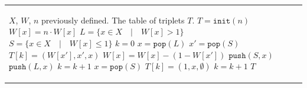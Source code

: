 \begin{algorithm}[htb]
\caption{Building of the Alias Tables by Vose (adaptation for fractions) and by Rust language} 
\label{algo:preprocessing}
    \begin{tabular}{l l}
        \begin{minipage}{0.52\textwidth}
            \begin{algorithmic}[1]
                \scriptsize
                \renewcommand{\algorithmicrequire}{\textbf{Input:}}
                \renewcommand{\algorithmicensure}{\textbf{Output:}}
                \Require $X$, $W$, $n$ previously defined.
                \Ensure  The table of triplets $T$.
                \Function{Table\_Fractions}{$X, n, W$}
                    \State $T = \texttt{init}(n)$ %
                    \For{$x \in X$}
                        \State $W[x] = n \cdot W[x]$ %
                    \EndFor
                    \State $L = \{x \in X \quad | \quad W[x] > 1\}$ %
                    \State $S = \{x \in X \quad | \quad W[x] \leq 1\}$ %
                    \State $k = 0$
                    \While{$L$ is not empty}
                        \State $x = \texttt{pop}(L)$ %
                        \State $x' = \texttt{pop}(S)$ 
                        \State $T[k] = (W[x'], x', x)$
                        \State $W[x] = W[x] - (1 - W[x'])$
                        \If{$W[x] \leq 1$}
                            \State $\texttt{push}(S, x)$ %
                        \Else
                            \State $\texttt{push}(L, x)$
                        \EndIf
                        \State $k = k + 1$
                    \EndWhile
                    \While{$S$ is not empty}
                        \State $x = \texttt{pop}(S)$
                        \State $T[k] = (1, x, \emptyset)$
                        \State $k = k + 1$
                    \EndWhile
                    \State \Return $T$
                \EndFunction
            \end{algorithmic}   
        \end{minipage}
        &
        \begin{minipage}{0.5\textwidth}
            \begin{algorithmic}[1]
                \scriptsize
                \renewcommand{\algorithmicrequire}{\textbf{Input:}}

\end{algorithmic}
\end{minipage}
\end{tabular}
\end{algorithm}
